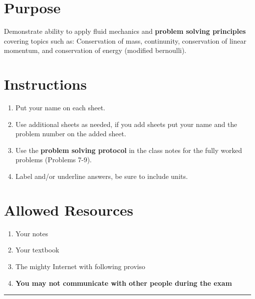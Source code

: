\documentclass[12pt]{article}
\begin{document}
\section*{ }
\section*{Purpose}
Demonstrate ability to apply fluid mechanics and \textbf{problem solving principles} covering topics such as: Conservation of mass, continunity, conservation of linear momentum, and conservation of energy (modified bernoulli).
\section*{Instructions}
\begin{enumerate}
\item Put your name on each sheet.  
\item Use additional sheets as needed, if you add sheets put your name and the problem number on the added sheet. 
\item Use the \textbf{problem solving protocol} in the class notes for the fully worked problems (Problems 7-9).  
\item Label and/or underline answers, be sure to include units.

\end{enumerate}
\section*{Allowed Resources}
\begin{enumerate}
\item Your notes
\item Your textbook
\item The mighty Internet with following proviso
\item  \textbf{You may not communicate with other people during the exam}
\end{enumerate}
\noindent\rule{\linewidth}{0.4pt}
\clearpage
\end{document}
